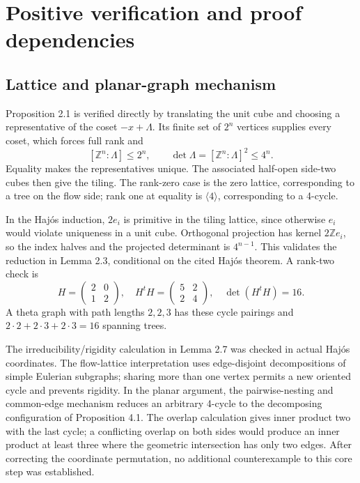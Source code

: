 \documentclass[10pt]{article}
\begin{document}
\section*{Positive verification and proof dependencies}
\subsection*{Lattice and planar-graph mechanism}
Proposition 2.1 is verified directly by translating the unit cube and choosing a representative of the coset \(-x+\Lambda\). Its finite set of \(2^n\) vertices supplies every coset, which forces full rank and \[[\mathbb Z^n:\Lambda]\le2^n,\qquad
 \det\Lambda=[\mathbb Z^n:\Lambda]^2\le4^n.               \tag{3.1}\] Equality makes the representatives unique. The associated half-open side-two cubes then give the tiling. The rank-zero case is the zero lattice, corresponding to a tree on the flow side; rank one at equality is \(\langle4\rangle\), corresponding to a 4-cycle.\par
In the Hajós induction, \(2e_i\) is primitive in the tiling lattice, since otherwise \(e_i\) would violate uniqueness in a unit cube. Orthogonal projection has kernel \(2\mathbb Ze_i\), so the index halves and the projected determinant is \(4^{n-1}\). This validates the reduction in Lemma 2.3, conditional on the cited Hajós theorem. A rank-two check is \[H=\begin{pmatrix}2&0\\1&2\end{pmatrix},\quad
 H^tH=\begin{pmatrix}5&2\\2&4\end{pmatrix},\quad
 \det(H^tH)=16.                                  \tag{3.2}\] A theta graph with path lengths \(2,2,3\) has these cycle pairings and \(2\cdot2+2\cdot3+2\cdot3=16\) spanning trees.\par
The irreducibility/rigidity calculation in Lemma 2.7 was checked in actual Hajós coordinates. The flow-lattice interpretation uses edge-disjoint decompositions of simple Eulerian subgraphs; sharing more than one vertex permits a new oriented cycle and prevents rigidity. In the planar argument, the pairwise-nesting and common-edge mechanism reduces an arbitrary 4-cycle to the decomposing configuration of Proposition 4.1. The overlap calculation gives inner product two with the last cycle; a conflicting overlap on both sides would produce an inner product at least three where the geometric intersection has only two edges. After correcting the coordinate permutation, no additional counterexample to this core step was established.\par
\end{document}
